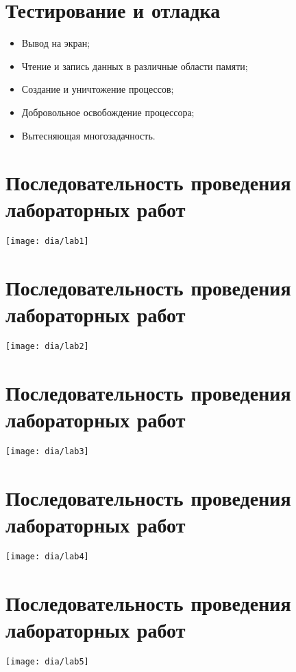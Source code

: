 \documentclass[12pt]{article}
\begin{document}
\section{\textbf{Тестирование и отладка}}
\begin{itemize}
\item Вывод на экран;
\item Чтение и запись данных в различные области памяти;
\item Создание и уничтожение процессов;
\item Добровольное освобождение процессора;
\item Вытесняющая многозадачность.
\end{itemize}


\section{\textbf{Последовательность проведения лабораторных работ}}
\begin{center}
\texttt{[image: dia/lab1]}
\end{center}


\section{\textbf{Последовательность проведения лабораторных работ}}
\begin{center}
\texttt{[image: dia/lab2]}
\end{center}


\section{\textbf{Последовательность проведения лабораторных работ}}
\begin{center}
\texttt{[image: dia/lab3]}
\end{center}


\section{\textbf{Последовательность проведения лабораторных работ}}
\begin{center}
\texttt{[image: dia/lab4]}
\end{center}


\section{\textbf{Последовательность проведения лабораторных работ}}
\begin{center}
\texttt{[image: dia/lab5]}
\end{center}
\end{document}
